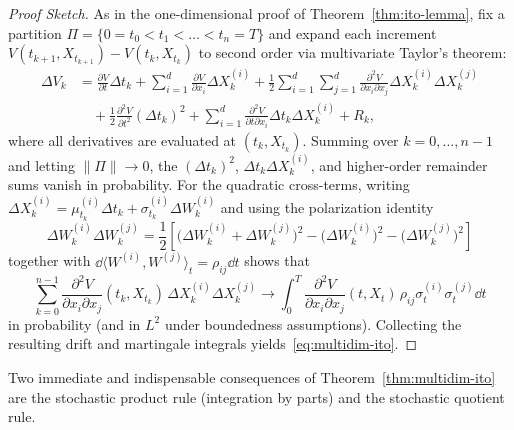 \begin{proof}[Proof Sketch]
As in the one-dimensional proof of Theorem~\ref{thm:ito-lemma}, fix a partition $\Pi = \{0 = t_0 < t_1 < \dots < t_n = T\}$ and expand each increment $V(t_{k+1}, X_{t_{k+1}}) - V(t_k, X_{t_k})$ to second order via multivariate Taylor's theorem:
\begin{align*}
\Delta V_k &= \frac{\partial V}{\partial t}\Delta t_k + \sum_{i=1}^{d}\frac{\partial V}{\partial x_i}\Delta X_k^{(i)} + \frac{1}{2}\sum_{i=1}^{d}\sum_{j=1}^{d}\frac{\partial^2 V}{\partial x_i \partial x_j}\Delta X_k^{(i)}\Delta X_k^{(j)} \\
&\quad + \frac{1}{2}\frac{\partial^2 V}{\partial t^2}(\Delta t_k)^2 + \sum_{i=1}^{d}\frac{\partial^2 V}{\partial t \partial x_i}\Delta t_k \Delta X_k^{(i)} + R_k,
\end{align*}
where all derivatives are evaluated at $(t_k, X_{t_k})$. Summing over $k = 0, \dots, n-1$ and letting $\|\Pi\| \to 0$, the $(\Delta t_k)^2$, $\Delta t_k \Delta X_k^{(i)}$, and higher-order remainder sums vanish in probability. For the quadratic cross-terms, writing $\Delta X_k^{(i)} = \mu_{t_k}^{(i)}\Delta t_k + \sigma_{t_k}^{(i)}\Delta W_k^{(i)}$ and using the polarization identity
\[
\Delta W_k^{(i)}\Delta W_k^{(j)} = \frac{1}{2}\left[\big(\Delta W_k^{(i)} + \Delta W_k^{(j)}\big)^2 - \big(\Delta W_k^{(i)}\big)^2 - \big(\Delta W_k^{(j)}\big)^2\right]
\]
together with $\dd\langle W^{(i)}, W^{(j)} \rangle_t = \rho_{ij}\dd t$ shows that
\[
\sum_{k=0}^{n-1} \frac{\partial^2 V}{\partial x_i \partial x_j}(t_k, X_{t_k})\,\Delta X_k^{(i)}\Delta X_k^{(j)} \longrightarrow \int_0^T \frac{\partial^2 V}{\partial x_i \partial x_j}(t, X_t)\,\rho_{ij}\sigma_t^{(i)}\sigma_t^{(j)}\dd t
\]
in probability (and in $L^2$ under boundedness assumptions). Collecting the resulting drift and martingale integrals yields~\eqref{eq:multidim-ito}.
\end{proof}

Two immediate and indispensable consequences of Theorem~\ref{thm:multidim-ito} are the stochastic product rule (integration by parts) and the stochastic quotient rule.

